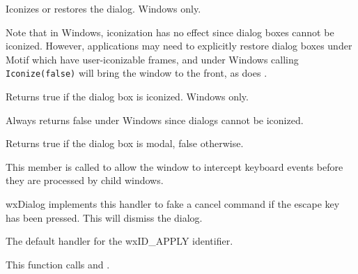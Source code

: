 Iconizes or restores the dialog. Windows only.




Note that in Windows, iconization has no effect since dialog boxes cannot be
iconized. However, applications may need to explicitly restore dialog
boxes under Motif which have user-iconizable frames, and under Windows
calling {\tt Iconize(false)} will bring the window to the front, as does
.

\label{wxdialogisiconized}


Returns true if the dialog box is iconized. Windows only.


Always returns false under Windows since dialogs cannot be iconized.

\label{wxdialogismodal}


Returns true if the dialog box is modal, false otherwise.

\label{wxdialogoncharhook}


This member is called to allow the window to intercept keyboard events
before they are processed by child windows.



wxDialog implements this handler to fake a cancel command if the escape key has been
pressed. This will dismiss the dialog.

\label{wxdialogonapply}


The default handler for the wxID\_APPLY identifier.


This function calls  and .

